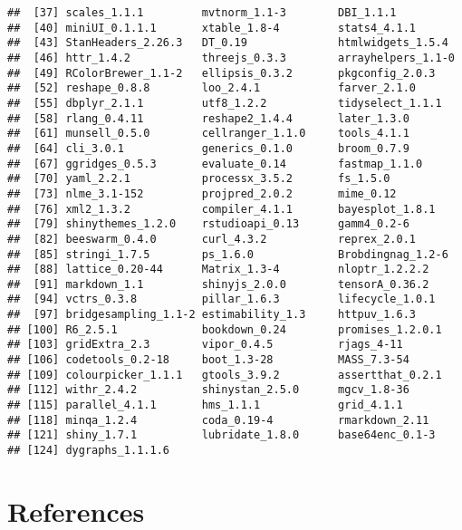 \documentclass[
  11pt,
  english,
  ,doc,floatsintext]{apa6}
\begin{document}
\begin{verbatim}
##  [37] scales_1.1.1         mvtnorm_1.1-3        DBI_1.1.1           
##  [40] miniUI_0.1.1.1       xtable_1.8-4         stats4_4.1.1        
##  [43] StanHeaders_2.26.3   DT_0.19              htmlwidgets_1.5.4   
##  [46] httr_1.4.2           threejs_0.3.3        arrayhelpers_1.1-0  
##  [49] RColorBrewer_1.1-2   ellipsis_0.3.2       pkgconfig_2.0.3     
##  [52] reshape_0.8.8        loo_2.4.1            farver_2.1.0        
##  [55] dbplyr_2.1.1         utf8_1.2.2           tidyselect_1.1.1    
##  [58] rlang_0.4.11         reshape2_1.4.4       later_1.3.0         
##  [61] munsell_0.5.0        cellranger_1.1.0     tools_4.1.1         
##  [64] cli_3.0.1            generics_0.1.0       broom_0.7.9         
##  [67] ggridges_0.5.3       evaluate_0.14        fastmap_1.1.0       
##  [70] yaml_2.2.1           processx_3.5.2       fs_1.5.0            
##  [73] nlme_3.1-152         projpred_2.0.2       mime_0.12           
##  [76] xml2_1.3.2           compiler_4.1.1       bayesplot_1.8.1     
##  [79] shinythemes_1.2.0    rstudioapi_0.13      gamm4_0.2-6         
##  [82] beeswarm_0.4.0       curl_4.3.2           reprex_2.0.1        
##  [85] stringi_1.7.5        ps_1.6.0             Brobdingnag_1.2-6   
##  [88] lattice_0.20-44      Matrix_1.3-4         nloptr_1.2.2.2      
##  [91] markdown_1.1         shinyjs_2.0.0        tensorA_0.36.2      
##  [94] vctrs_0.3.8          pillar_1.6.3         lifecycle_1.0.1     
##  [97] bridgesampling_1.1-2 estimability_1.3     httpuv_1.6.3        
## [100] R6_2.5.1             bookdown_0.24        promises_1.2.0.1    
## [103] gridExtra_2.3        vipor_0.4.5          rjags_4-11          
## [106] codetools_0.2-18     boot_1.3-28          MASS_7.3-54         
## [109] colourpicker_1.1.1   gtools_3.9.2         assertthat_0.2.1    
## [112] withr_2.4.2          shinystan_2.5.0      mgcv_1.8-36         
## [115] parallel_4.1.1       hms_1.1.1            grid_4.1.1          
## [118] minqa_1.2.4          coda_0.19-4          rmarkdown_2.11      
## [121] shiny_1.7.1          lubridate_1.8.0      base64enc_0.1-3     
## [124] dygraphs_1.1.1.6
\end{verbatim}

\newpage

\hypertarget{references}{%
\section*{References}\label{references}}
\end{document}
